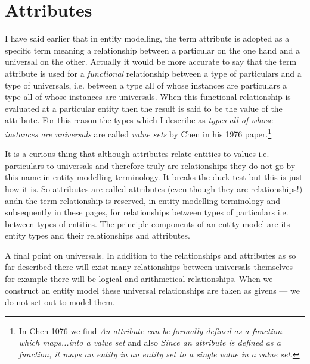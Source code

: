 

\section{Attributes}
\label{Attributes}
\mynote I have said earlier that in entity modelling, the term attribute is adopted as a specific term meaning a relationship between a particular on the one hand and a universal on the other. Actually it would be more accurate to say that the term attribute is used for a \textit{functional} relationship between a type of particulars and a type of universals,
 i.e. between a type all of whose instances are particulars a type all of whose instances are universals.
When this functional relationship is evaluated at a particular entity then the result is said to be the value of the attribute. For this reason the types which I describe as \textit{types all of whose instances are universals} are called \textit{value sets} by Chen in his  1976 paper.\footnote{
In Chen 1076 we find \textit{An attribute can be formally defined as a function which maps...into a value set} and also \textit{Since an attribute is defined as a function, it maps an entity in an entity set to a single value in a value set}.} 

\mynote
 It is a curious thing that  although attributes relate entities to  values i.e. particulars to universals
 and therefore truly are relationships they do not go by this name in entity modelling terminology. It breaks the duck test but this is just how it is.  So attributes are called attributes (even though they are relationships!) andn the term relationship is reserved, in entity modelling terminology and subsequently in these pages, for relationships between types of particulars i.e. between types of entities. 
 The principle components of an entity model are its entity types and their relationships and attributes.

\mynote A final point on universals. In addition to the relationships and attributes as so far described there will exist many relationships between universals themselves
for example there will be logical and arithmetical relationships. When we construct an entity model these universal relationships are taken as givens --- we do not set out to model them.


